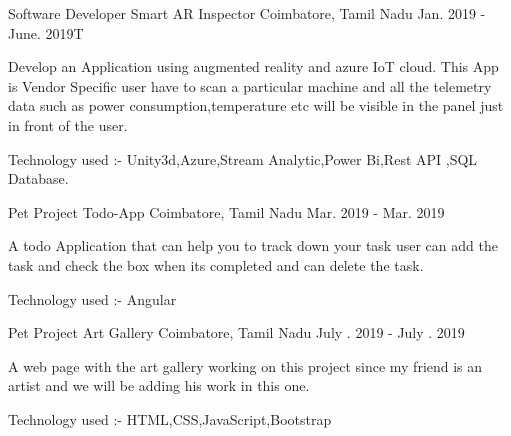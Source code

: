 


\begin{cventries}


   \cventry
    {Software Developer} %
    {{Smart AR Inspector}} %
    {Coimbatore, Tamil Nadu} %
    {Jan. 2019 - June. 2019T} %
    {
      \begin{cvitems} %
        \item {Develop an Application using augmented reality and azure IoT cloud. This App is Vendor Specific user have to \newline
        scan a particular machine and all the telemetry data such as power consumption,temperature etc will be visible \newline in the panel just in front of the user.}
        \item {Technology used :- Unity3d,Azure,Stream Analytic,Power Bi,Rest API ,SQL Database.}
      \end{cvitems}
    }


 \cventry
    {Pet Project} %
    {{Todo-App}} %
    {Coimbatore, Tamil Nadu} %
    {Mar. 2019 - Mar. 2019} %
    {
      \begin{cvitems} %
        \item {A todo Application that can help you to track down your task user can add the task and check the box \newline when its completed and can delete the task.}
        \item {Technology used :- Angular}
      \end{cvitems}
    }


\cventry
    {Pet Project} %
    {{Art Gallery}} %
    {Coimbatore, Tamil Nadu} %
    {July . 2019 - July . 2019} %
    {
      \begin{cvitems} %
        \item {A web page with the art gallery working on this project since my friend is an artist and we will be adding \newline his work in this one.}
        \item {Technology used :- HTML,CSS,JavaScript,Bootstrap}
      \end{cvitems}
    }
 

\end{cventries}
